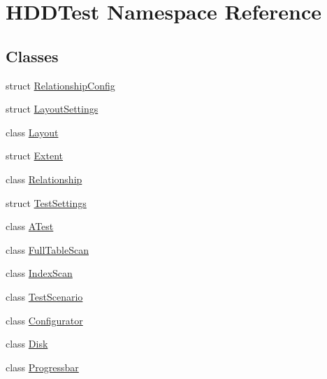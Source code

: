 \hypertarget{namespace_h_d_d_test}{\section{H\-D\-D\-Test Namespace Reference}
\label{namespace_h_d_d_test}
}
\subsection*{Classes}
\begin{DoxyCompactItemize}
\item 
struct \hyperlink{struct_h_d_d_test_1_1_relationship_config}{Relationship\-Config}
\item 
struct \hyperlink{struct_h_d_d_test_1_1_layout_settings}{Layout\-Settings}
\item 
class \hyperlink{class_h_d_d_test_1_1_layout}{Layout}
\item 
struct \hyperlink{struct_h_d_d_test_1_1_extent}{Extent}
\item 
class \hyperlink{class_h_d_d_test_1_1_relationship}{Relationship}
\item 
struct \hyperlink{struct_h_d_d_test_1_1_test_settings}{Test\-Settings}
\item 
class \hyperlink{class_h_d_d_test_1_1_a_test}{A\-Test}
\item 
class \hyperlink{class_h_d_d_test_1_1_full_table_scan}{Full\-Table\-Scan}
\item 
class \hyperlink{class_h_d_d_test_1_1_index_scan}{Index\-Scan}
\item 
class \hyperlink{class_h_d_d_test_1_1_test_scenario}{Test\-Scenario}
\item 
class \hyperlink{class_h_d_d_test_1_1_configurator}{Configurator}
\item 
class \hyperlink{class_h_d_d_test_1_1_disk}{Disk}
\item 
class \hyperlink{class_h_d_d_test_1_1_progressbar}{Progressbar}
\end{DoxyCompactItemize}
